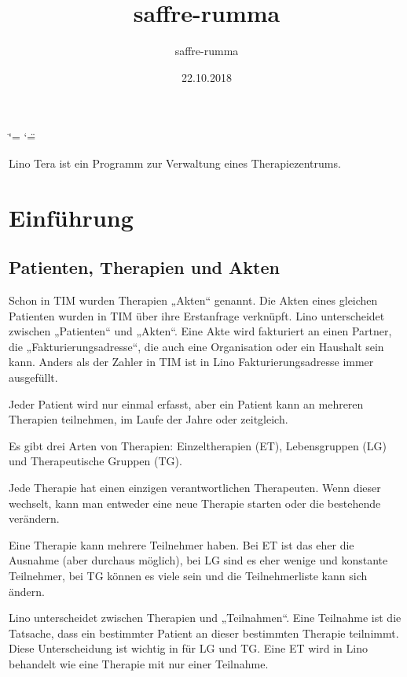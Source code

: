 \documentclass[letterpaper,10pt,ngerman]{sphinxmanual}
\title{saffre-rumma}
\date{22.10.2018}
\author{saffre-rumma}
\begin{document}
\ifdefined\shorthandoff
  \ifnum\catcode`\=\string=\active\shorthandoff{=}\fi
  \ifnum\catcode`\"=\active{}\fi
\fi

\maketitle
\sphinxtableofcontents
{}\label{\detokenize{index::doc}}


Lino Tera ist ein Programm zur Verwaltung eines Therapiezentrums.


\chapter{Einführung}
\label{\detokenize{intro:einfuhrung}}\label{\detokenize{intro::doc}}

\section{Patienten, Therapien und Akten}
\label{\detokenize{intro:patienten-therapien-und-akten}}
Schon in TIM wurden Therapien „Akten“ genannt. Die Akten eines
gleichen Patienten wurden in TIM über ihre Erstanfrage verknüpft.
Lino unterscheidet zwischen „Patienten“ und „Akten“.  Eine Akte wird
fakturiert an einen Partner, die „Fakturierungsadresse“, die auch eine
Organisation oder ein Haushalt sein kann.  Anders als der Zahler in
TIM ist in Lino Fakturierungsadresse immer ausgefüllt.

Jeder Patient wird nur einmal erfasst, aber ein Patient kann an
mehreren Therapien teilnehmen, im Laufe der Jahre oder zeitgleich.

Es gibt drei Arten von Therapien: Einzeltherapien (ET), Lebensgruppen
(LG) und Therapeutische Gruppen (TG).

Jede Therapie hat einen einzigen verantwortlichen Therapeuten. Wenn
dieser wechselt, kann man entweder eine neue Therapie starten oder die
bestehende verändern.

Eine Therapie kann mehrere Teilnehmer haben. Bei ET ist das eher die
Ausnahme (aber durchaus möglich), bei LG sind es eher wenige und
konstante Teilnehmer, bei TG können es viele sein und die
Teilnehmerliste kann sich ändern.

Lino unterscheidet zwischen Therapien und „Teilnahmen“. Eine Teilnahme
ist die Tatsache, dass ein bestimmter Patient an dieser bestimmten
Therapie teilnimmt. Diese Unterscheidung ist wichtig in für LG und TG.
Eine ET wird in Lino behandelt wie eine Therapie mit nur einer
Teilnahme.
\end{document}
